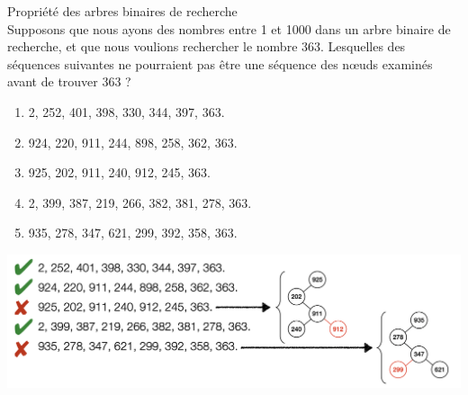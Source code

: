     \begin{Exercice}[10 minutes] Propriété des arbres binaires de recherche\\

    Supposons que nous ayons des nombres entre 1 et 1000 dans un arbre binaire de recherche, et que nous voulions rechercher le nombre 363. Lesquelles des séquences suivantes ne pourraient pas être une séquence des nœuds examinés avant de trouver 363 ?

    \begin{enumerate}
        \item 2, 252, 401, 398, 330, 344, 397, 363.
        \item 924, 220, 911, 244, 898, 258, 362, 363.
        \item 925, 202, 911, 240, 912, 245, 363.
        \item 2, 399, 387, 219, 266, 382, 381, 278, 363.
        \item 935, 278, 347, 621, 299, 392, 358, 363. 
    \end{enumerate}

    \begin{solution}
            \includegraphics[width=1\textwidth]{img/question4.png}
    \end{solution}

        
    \end{Exercice}
    
